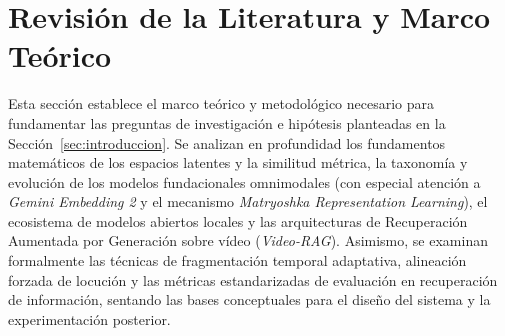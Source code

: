 \section{Revisión de la Literatura y Marco Teórico}
\label{sec:revision_literatura}

Esta sección establece el marco teórico y metodológico necesario para fundamentar las preguntas de investigación e hipótesis planteadas en la Sección~\ref{sec:introduccion}. Se analizan en profundidad los fundamentos matemáticos de los espacios latentes y la similitud métrica, la taxonomía y evolución de los modelos fundacionales omnimodales (con especial atención a \textit{Gemini Embedding 2} y el mecanismo \textit{Matryoshka Representation Learning}), el ecosistema de modelos abiertos locales y las arquitecturas de Recuperación Aumentada por Generación sobre vídeo (\textit{Video-RAG}). Asimismo, se examinan formalmente las técnicas de fragmentación temporal adaptativa, alineación forzada de locución y las métricas estandarizadas de evaluación en recuperación de información, sentando las bases conceptuales para el diseño del sistema y la experimentación posterior.


\newpage


\newpage


\newpage


\newpage


\newpage




